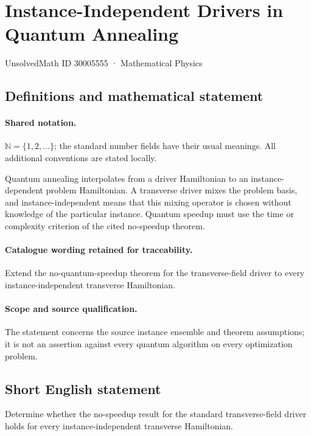 \documentclass[11pt]{article}
\begin{document}
\setcounter{section}{30005554}
\section{Instance-Independent Drivers in Quantum Annealing}\label{30005555}
{\small UnsolvedMath ID 30005555 · Mathematical Physics}
\subsection{Definitions and mathematical statement}

\paragraph{Shared notation.}$\mathbb N=\{1,2,\ldots\}$; the standard number fields have their usual meanings. All additional conventions are stated locally.


Quantum annealing interpolates from a driver Hamiltonian to an instance-dependent problem Hamiltonian. A transverse driver mixes the problem basis, and instance-independent means that this mixing operator is chosen without knowledge of the particular instance. Quantum speedup must use the time or complexity criterion of the cited no-speedup theorem.

\paragraph{Catalogue wording retained for traceability.}
Extend the no-quantum-speedup theorem for the transverse-field driver to every instance-independent transverse Hamiltonian.

\paragraph{Scope and source qualification.}The statement concerns the source instance ensemble and theorem assumptions; it is not an assertion against every quantum algorithm on every optimization problem.
\subsection{Short English statement}
Determine whether the no-speedup result for the standard transverse-field driver holds for every instance-independent transverse Hamiltonian.
\end{document}

